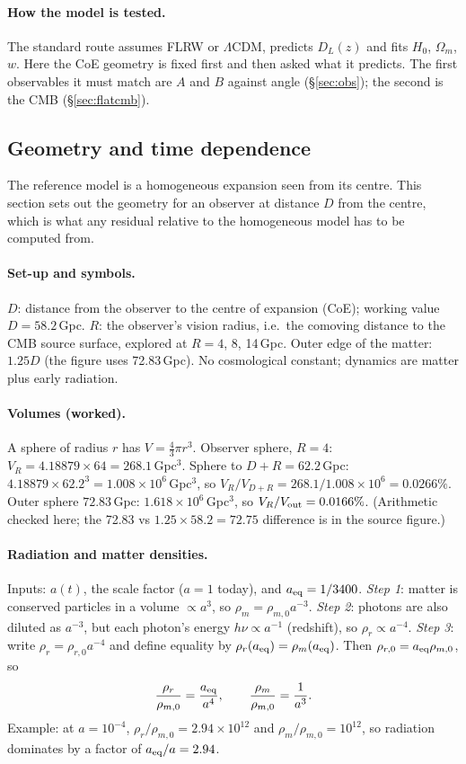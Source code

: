 \documentclass[10pt,twocolumn]{article}
\begin{document}
\paragraph{How the model is tested.} The standard route assumes FLRW or $\Lambda$CDM, predicts $D_L(z)$ and fits $H_0$, $\Omega_m$, $w$. Here the CoE geometry is fixed first and then asked what it predicts. The first observables it must match are $A$ and $B$ against angle (\S\ref{sec:obs}); the second is the CMB (\S\ref{sec:flatcmb}).

\subsection{Geometry and time dependence}
The reference model is a homogeneous expansion seen from its centre. This section sets out the geometry for an observer at distance $D$ from the centre, which is what any residual relative to the homogeneous model has to be computed from.

\paragraph{Set-up and symbols.} $D$: distance from the observer to the centre of expansion (CoE); working value $D=58.2$\,Gpc. $R$: the observer's vision radius, i.e.\ the comoving distance to the CMB source surface, explored at $R=4$, 8, 14\,Gpc. Outer edge of the matter: $1.25D$ (the figure uses 72.83\,Gpc). No cosmological constant; dynamics are matter plus early radiation.

\paragraph{Volumes (worked).} A sphere of radius $r$ has $V=\tfrac43\pi r^3$. Observer sphere, $R=4$: $V_R=4.18879\times64=268.1$\,Gpc$^3$. Sphere to $D+R=62.2$\,Gpc: $4.18879\times62.2^3=1.008\times10^6$\,Gpc$^3$, so $V_R/V_{D+R}=268.1/1.008\times10^6=0.0266\%$. Outer sphere $72.83$\,Gpc: $1.618\times10^6$\,Gpc$^3$, so $V_R/V_{\rm out}=0.0166\%$. (Arithmetic checked here; the 72.83 vs $1.25\times58.2=72.75$ difference is in the source figure.)

\paragraph{Radiation and matter densities.} Inputs: $a(t)$, the scale factor ($a=1$ today), and $a_{\rm eq}=1/3400$. \emph{Step 1}: matter is conserved particles in a volume $\propto a^3$, so $\rho_m=\rho_{m,0}a^{-3}$. \emph{Step 2}: photons are also diluted as $a^{-3}$, but each photon's energy $h\nu\propto a^{-1}$ (redshift), so $\rho_r\propto a^{-4}$. \emph{Step 3}: write $\rho_r=\rho_{r,0}a^{-4}$ and define equality by $\rho_r(a_{\rm eq})=\rho_m(a_{\rm eq})$. Then $\rho_{r,0}=a_{\rm eq}\rho_{m,0}$, so
\begin{equation}\label{eq1}
\frac{\rho_r}{\rho_{m,0}}=\frac{a_{\rm eq}}{a^4},\qquad\frac{\rho_m}{\rho_{m,0}}=\frac{1}{a^3}.
\end{equation}
Example: at $a=10^{-4}$, $\rho_r/\rho_{m,0}=2.94\times10^{12}$ and $\rho_m/\rho_{m,0}=10^{12}$, so radiation dominates by a factor of $a_{\rm eq}/a=2.94$.
\end{document}
